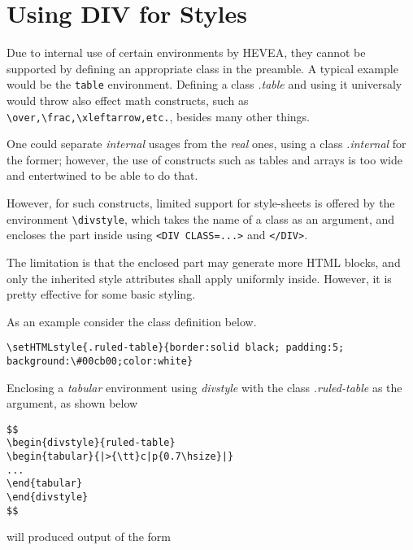 \documentclass {article}
\begin{document}
\section{Using DIV for Styles}
Due to internal use of certain environments by HEVEA, they cannot be supported by defining an appropriate class in the preamble. A typical example would be the \texttt{table} environment. Defining a class \emph{.table} and using it universaly would throw also effect math constructs, such as \verb+\over,\frac,\xleftarrow,etc.+, besides many other things.

One could separate \emph{internal} usages from the \emph{real} ones, using a class \emph{.internal} for the former; however, the use of constructs such as tables and arrays is too wide and entertwined to be able to do that. 

However, for such constructs, limited support for style-sheets is offered by the environment \verb+\divstyle+, which takes the name of a class as an argument, and encloses the part inside using \verb+<DIV CLASS=...>+ and \verb+</DIV>+. 

The limitation is that the enclosed part may generate more HTML blocks, and only the inherited style attributes shall apply uniformly inside. However, it is pretty effective for some basic styling.

As an example consider the class definition below.
\begin{verbatim}
\setHTMLstyle{.ruled-table}{border:solid black; padding:5; background:\#00cb00;color:white}
\end{verbatim}   
Enclosing a \emph{tabular} environment using \emph{divstyle} with the class \emph{.ruled-table} as the argument, as shown below
\begin{verbatim}
$$
\begin{divstyle}{ruled-table}
\begin{tabular}{|>{\tt}c|p{0.7\hsize}|}
...
\end{tabular}
\end{divstyle}
$$
\end{verbatim}
will produced output of the form
\end{document}
